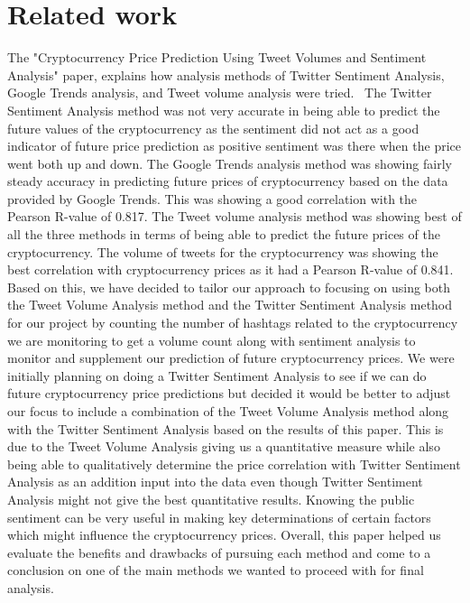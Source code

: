 \documentclass[final]{cvpr}
\begin{document}
\section{Related work}
The "Cryptocurrency Price Prediction Using Tweet Volumes and Sentiment Analysis" paper, explains how analysis methods of Twitter Sentiment Analysis, Google Trends analysis, and Tweet volume analysis were tried.~\cite{Alpher} The Twitter Sentiment Analysis method was not very accurate in being able to predict the future values of the cryptocurrency as the sentiment did not act as a good indicator of future price prediction as positive sentiment was there when the price went both up and down. The Google Trends analysis method was showing fairly steady accuracy in predicting future prices of cryptocurrency based on the data provided by Google Trends. This was showing a good correlation with the Pearson R-value of 0.817. The Tweet volume analysis method was showing best of all the three methods in terms of being able to predict the future prices of the cryptocurrency. The volume of tweets for the cryptocurrency was showing the best correlation with cryptocurrency prices as it had a Pearson R-value of 0.841. Based on this, we have decided to tailor our approach to focusing on using both the Tweet Volume Analysis method and the Twitter Sentiment Analysis method for our project by counting the number of hashtags related to the cryptocurrency we are monitoring to get a volume count along with sentiment analysis to monitor and supplement our prediction of future cryptocurrency prices. We were initially planning on doing a Twitter Sentiment Analysis to see if we can do future cryptocurrency price predictions but decided it would be better to adjust our focus to include a combination of the Tweet Volume Analysis method along with the Twitter Sentiment Analysis based on the results of this paper. This is due to the Tweet Volume Analysis giving us a quantitative measure while also being able to qualitatively determine the price correlation with Twitter Sentiment Analysis as an addition input into the data even though Twitter Sentiment Analysis might not give the best quantitative results. Knowing the public sentiment can be very useful in making key determinations of certain factors which might influence the cryptocurrency prices. Overall, this paper helped us evaluate the benefits and drawbacks of pursuing each method and come to a conclusion on one of the main methods we wanted to proceed with for final analysis.~\cite{Alpher}
\end{document}
